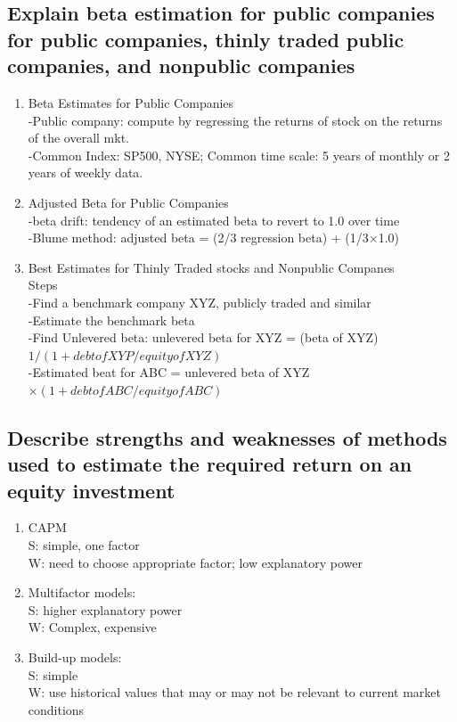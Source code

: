 \documentclass{article}
\newcommand{\be}{\begin{enumerate}}
\newcommand{\ee}{\end{enumerate}}
\begin{document}
\subsection{Explain beta estimation for public companies for public companies, thinly
traded public companies, and nonpublic companies}
\be
    \item Beta Estimates for Public Companies
        \\-Public company: compute by regressing the returns of stock on the returns
        of the overall mkt.
        \\-Common Index: SP500, NYSE; Common time scale: 5 years of monthly or 2 years of weekly data.
    \item Adjusted Beta for Public Companies
        \\-beta drift: tendency of an estimated beta to revert to 1.0 over time
        \\-Blume method: adjusted beta = (2/3 regression beta) + (1/3$\times$1.0)
    \item Best Estimates for Thinly Traded stocks and Nonpublic Companes
        \\Steps
        \\-Find a benchmark company XYZ, publicly traded and similar
        \\-Estimate the benchmark beta
        \\-Find Unlevered beta: unlevered beta for XYZ = (beta of XYZ) $1/(1+debt of XYP/equity of XYZ)$
        \\-Estimated beat for ABC = unlevered beta of XYZ $\times (1+debt of ABC/equity of ABC)$ 
\ee
\subsection{Describe strengths and weaknesses of methods used to estimate the required
return on an equity investment}
\be
    \item CAPM
        \\S: simple, one factor
        \\W: need to choose appropriate factor; low explanatory power
    \item Multifactor models:
        \\S: higher explanatory power
        \\W: Complex, expensive
    \item Build-up models: 
        \\S: simple
        \\W: use historical values that may or may not be relevant to current market conditions
\ee
\end{document}
